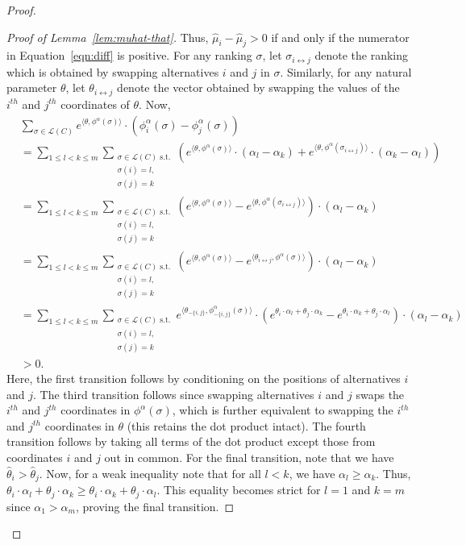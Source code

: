 \documentclass[10pt,letterpaper]{article}
\newcommand{\calL}{{\mathcal{L}}}
\newcommand{\rank}{{\calL(C)}}
\newcommand{\phia}{\phi^{\alpha}}
\newcommand{\muhat}{\hat{\mu}}
\newcommand{\that}{\hat{\theta}}
\begin{document}
\begin{proof}
\begin{proof}[Proof of Lemma~\ref{lem:muhat-that}]
Thus, $\muhat_i - \muhat_j > 0$ if and only if the numerator in Equation~\eqref{eqn:diff} is positive. For any ranking $\sigma$, let $\sigma_{i \leftrightarrow j}$ denote the ranking which is obtained by swapping alternatives $i$ and $j$ in $\sigma$. Similarly, for any natural parameter $\theta$, let $\theta_{i \leftrightarrow j}$ denote the vector obtained by swapping the values of the $i^{th}$ and $j^{th}$ coordinates of $\theta$. Now,
\begin{align*}
&\sum_{\sigma \in \rank} e^{\langle \theta, \phia(\sigma) \rangle} \cdot (\phia_i(\sigma)-\phia_j(\sigma)) \\
&= \sum_{1 \le l < k \le m} \sum_{\substack{\sigma \in \rank \text{ s.t.}\\\sigma(i) = l,\\ \sigma(j) = k}} \left(e^{\langle \theta, \phia(\sigma) \rangle} \cdot (\alpha_l-\alpha_k) +  e^{\langle \theta, \phia(\sigma_{i \leftrightarrow j}) \rangle} \cdot (\alpha_k-\alpha_l) \right)  \\
&= \sum_{1 \le l < k \le m} \sum_{\substack{\sigma \in \rank \text{ s.t.}\\\sigma(i) = l,\\ \sigma(j) = k}} \left(e^{\langle \theta, \phia(\sigma) \rangle} - e^{\langle \theta, \phia(\sigma_{i \leftrightarrow j}) \rangle}\right) \cdot (\alpha_l-\alpha_k) \\
&= \sum_{1 \le l < k \le m} \sum_{\substack{\sigma \in \rank \text{ s.t.}\\\sigma(i) = l,\\ \sigma(j) = k}} \left(e^{\langle \theta, \phia(\sigma) \rangle} - e^{\langle \theta_{i \leftrightarrow j}, \phia(\sigma) \rangle}\right) \cdot (\alpha_l-\alpha_k) \\
&= \sum_{1 \le l < k \le m} \sum_{\substack{\sigma \in \rank \text{ s.t.}\\\sigma(i) = l,\\ \sigma(j) = k}} e^{\langle \theta_{-\{i,j\}}, \phia_{-\{i,j\}}(\sigma) \rangle} \cdot \left(e^{\theta_i \cdot \alpha_l + \theta_j \cdot \alpha_k} - e^{\theta_i \cdot \alpha_k + \theta_j \cdot \alpha_l}\right) \cdot (\alpha_l-\alpha_k) \\
& > 0.
\end{align*}
Here, the first transition follows by conditioning on the positions of alternatives $i$ and $j$. The third transition follows since swapping alternatives $i$ and $j$ swaps the $i^{th}$ and $j^{th}$ coordinates in $\phia(\sigma)$, which is further equivalent to swapping the $i^{th}$ and $j^{th}$ coordinates in $\theta$ (this retains the dot product intact). The fourth transition follows by taking all terms of the dot product except those from coordinates $i$ and $j$ out in common. For the final transition, note that we have $\that_i > \that_j$. Now, for a weak inequality note that for all $l < k$, we have $\alpha_l \ge \alpha_k$. Thus, $\theta_i \cdot \alpha_l + \theta_j \cdot \alpha_k \ge \theta_i \cdot \alpha_k + \theta_j \cdot \alpha_l$. This equality becomes strict for $l=1$ and $k=m$ since $\alpha_1 > \alpha_m$, proving the final transition. 


\end{proof}
\end{proof}
\end{document}
